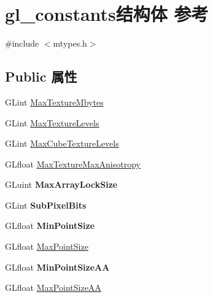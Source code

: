 \hypertarget{structgl__constants}{}\section{gl\+\_\+constants结构体 参考}
\label{structgl__constants}


{\ttfamily \#include $<$mtypes.\+h$>$}

\subsection*{Public 属性}
\begin{DoxyCompactItemize}
\item 
G\+Lint \hyperlink{structgl__constants_a1669926fd3acaca919c57649e6c4c981}{Max\+Texture\+Mbytes}
\item 
G\+Lint \hyperlink{structgl__constants_a39549977260c93b4c40ee479342b3e04}{Max\+Texture\+Levels}
\item 
G\+Lint \hyperlink{structgl__constants_ad80e90602b9961d17f67b73c5c954514}{Max\+Cube\+Texture\+Levels}
\item 
G\+Lfloat \hyperlink{structgl__constants_aa17379cc5c0bed5635a0af6c0f7fa454}{Max\+Texture\+Max\+Anisotropy}
\item 
\mbox{\label{structgl__constants_ac492d8d66a18647f0ef24695c24f7b0f}} 
G\+Luint {\bfseries Max\+Array\+Lock\+Size}
\item 
\mbox{\label{structgl__constants_a21c3cf248822bcaad635f1eca1c216ac}} 
G\+Lint {\bfseries Sub\+Pixel\+Bits}
\item 
\mbox{\label{structgl__constants_aaef8ac8d9890c568b05351c6ea9b6d1b}} 
G\+Lfloat {\bfseries Min\+Point\+Size}
\item 
G\+Lfloat \hyperlink{structgl__constants_a906d221b7e5953b8b48b7008f7eb2cd8}{Max\+Point\+Size}
\item 
\mbox{\label{structgl__constants_aa87ad9a827506f13f6fd10f952808c2a}} 
G\+Lfloat {\bfseries Min\+Point\+Size\+AA}
\item 
G\+Lfloat \hyperlink{structgl__constants_ae0d9753cb86e456e51930b61a4f8443c}{Max\+Point\+Size\+AA}
\item 
\mbox{\label{structgl__constants_a5dc2b02b0b9291f66bfbf847f7108094}} 

\end{DoxyCompactItemize}
